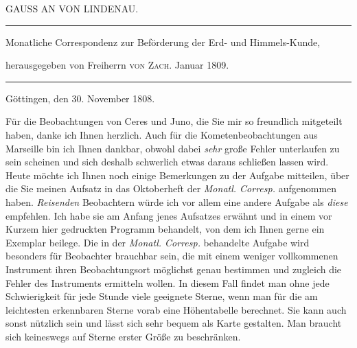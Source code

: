 \clearpage{}%
\begin{center}
{\small GAUSS AN VON LINDENAU.\par}
\medskip\hrule\medskip
{\small Monatliche Correspondenz zur Beförderung der Erd- und Himmels-Kunde,\par
herausgegeben von Freiherrn \textsc{von Zach}. Januar 1809.\par}
\medskip\hrule
\end{center}\medskip
\begin{flushright}Göttingen, den 30. November 1808.\end{flushright}
Für die Beobachtungen von Ceres und Juno, die Sie mir so freundlich mitgeteilt haben, danke ich Ihnen herzlich. Auch für die Kometenbeobachtungen aus Marseille bin ich Ihnen dankbar, obwohl dabei \emph{sehr} große Fehler unterlaufen zu sein scheinen und sich deshalb schwerlich etwas daraus schließen lassen wird. Heute möchte ich Ihnen noch einige Bemerkungen zu der Aufgabe mitteilen, über die Sie meinen Aufsatz in das Oktoberheft der \emph{Monatl. Corresp.} aufgenommen haben. \emph{Reisenden} Beobachtern würde ich vor allem eine andere Aufgabe als \emph{diese} empfehlen. Ich habe sie am Anfang jenes Aufsatzes erwähnt und in einem vor Kurzem hier gedruckten Programm behandelt, von dem ich Ihnen gerne ein Exemplar beilege. Die in der \emph{Monatl. Corresp.} behandelte Aufgabe wird besonders für Beobachter brauchbar sein, die mit einem weniger vollkommenen Instrument ihren Beobachtungsort möglichst genau bestimmen und zugleich die Fehler des Instruments ermitteln wollen. In diesem Fall findet man ohne jede Schwierigkeit für jede Stunde viele geeignete Sterne, wenn man für die am leichtesten erkennbaren Sterne vorab eine Höhentabelle berechnet. Sie kann auch sonst nützlich sein und lässt sich sehr bequem als Karte gestalten. Man braucht sich keineswegs auf Sterne erster Größe zu beschränken.
%
